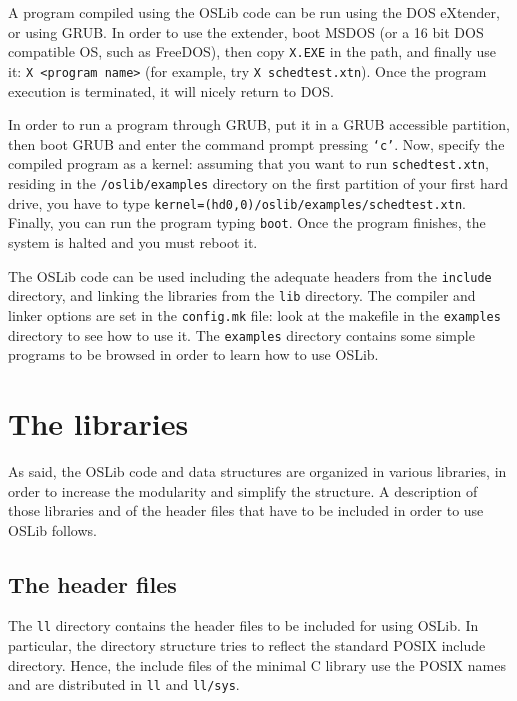 \documentclass[a4paper]{report}
\begin{document}
A program compiled using the OSLib code can be run using the DOS
eXtender, or using GRUB. In order to use the extender, boot MSDOS (or
a 16 bit DOS compatible OS, such as FreeDOS), then copy {\tt X.EXE}
in the path, and finally use it: {\tt X <program name>} (for example,
try {\tt X schedtest.xtn}). Once the program execution is terminated,
it will nicely return to DOS.

In order to run a program through GRUB, put it in a GRUB accessible
partition, then boot GRUB and enter the command prompt pressing
{\tt `c'}. Now, specify the compiled program as a kernel: assuming
that you want to run {\tt schedtest.xtn}, residing in the
{\tt /oslib/examples} directory on the first partition of your first
hard drive, you have to type {\tt kernel=(hd0,0)/oslib/examples/schedtest.xtn}.
Finally, you can run the program typing {\tt boot}. Once the program
finishes, the system is halted and you must reboot it.

The OSLib code can be used including the adequate headers
from the {\tt include} directory, and linking the libraries from the
{\tt lib} directory. The compiler and linker options are set in the
{\tt config.mk} file: look at the makefile in the {\tt examples} directory
to see how to use it. The {\tt examples} directory contains
some simple programs to be browsed in order to learn how to use OSLib.

\chapter{The libraries}
As said, the OSLib code and data structures are organized in various
libraries, in order to increase the modularity and simplify the
structure. A description of those libraries and of the header files
that have to be included in order to use OSLib follows.

\section{The header files}
The {\tt ll} directory contains the header files to be included for
using OSLib. In particular, the directory structure tries to reflect
the standard POSIX include directory. Hence, the include files of the
minimal C library use the POSIX names and are distributed in {\tt ll}
and {\tt ll/sys}.
\end{document}
